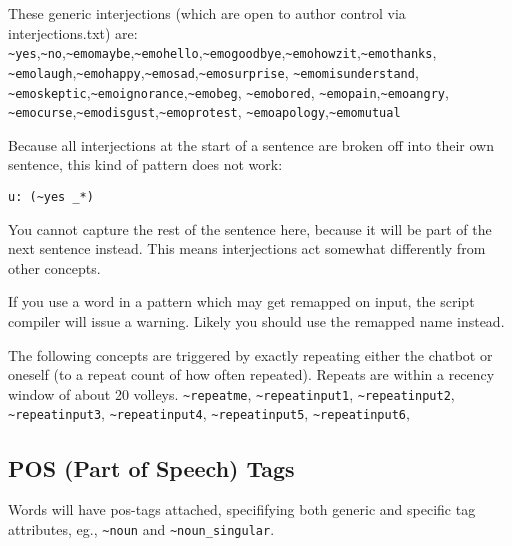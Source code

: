 \documentclass[]{article}
\begin{document}
These generic interjections (which are open to author control via
interjections.txt) are:
\texttt{\textasciitilde{}yes},\texttt{\textasciitilde{}no},\texttt{\textasciitilde{}emomaybe},\texttt{\textasciitilde{}emohello},\texttt{\textasciitilde{}emogoodbye},\texttt{\textasciitilde{}emohowzit},\texttt{\textasciitilde{}emothanks},
\texttt{\textasciitilde{}emolaugh},\texttt{\textasciitilde{}emohappy},\texttt{\textasciitilde{}emosad},\texttt{\textasciitilde{}emosurprise},
\texttt{\textasciitilde{}emomisunderstand},
\texttt{\textasciitilde{}emoskeptic},\texttt{\textasciitilde{}emoignorance},\texttt{\textasciitilde{}emobeg},
\texttt{\textasciitilde{}emobored},
\texttt{\textasciitilde{}emopain},\texttt{\textasciitilde{}emoangry},
\texttt{\textasciitilde{}emocurse},\texttt{\textasciitilde{}emodisgust},\texttt{\textasciitilde{}emoprotest},
\texttt{\textasciitilde{}emoapology},\texttt{\textasciitilde{}emomutual}

Because all interjections at the start of a sentence are broken off into
their own sentence, this kind of pattern does not work:

\begin{verbatim}
u: (~yes _*)
\end{verbatim}

You cannot capture the rest of the sentence here, because it will be
part of the next sentence instead. This means interjections act somewhat
differently from other concepts.

If you use a word in a pattern which may get remapped on input, the
script compiler will issue a warning. Likely you should use the remapped
name instead.

The following concepts are triggered by exactly repeating either the
chatbot or oneself (to a repeat count of how often repeated). Repeats
are within a recency window of about 20 volleys.
\texttt{\textasciitilde{}repeatme},
\texttt{\textasciitilde{}repeatinput1},
\texttt{\textasciitilde{}repeatinput2},
\texttt{\textasciitilde{}repeatinput3},
\texttt{\textasciitilde{}repeatinput4},
\texttt{\textasciitilde{}repeatinput5},
\texttt{\textasciitilde{}repeatinput6},

\subsection{POS (Part of Speech) Tags}\label{pos-part-of-speech-tags}

Words will have pos-tags attached, specififying both generic and
specific tag attributes, eg., \texttt{\textasciitilde{}noun} and
\texttt{\textasciitilde{}noun\_singular}.
\end{document}
